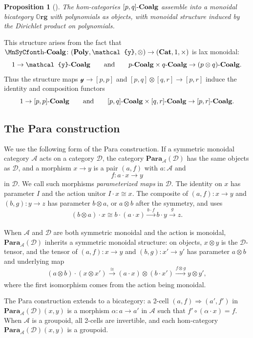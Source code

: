 \documentclass[11pt, oneside, article]{memoir}
\theoremstyle{definition}
\theoremstyle{plain}
\newtheorem{proposition}[proposition]{Proposition}
\DeclarePairedDelimiter{\ihom}{[}{]}
\newcommand{\cat}[1]{\mathcal{#1}}%
\newcommand{\Cat}[1]{\mathbf{#1}}%
\newcommand{\To}[2][]{\xrightarrow[#1]{#2}}
\newcommand{\tn}[1]{\textnormal{#1}}
\newcommand{\smcat}{\Cat{Cat}}
\newcommand{\yon}{\mathcal{y}}
\newcommand{\poly}{\Cat{Poly}}
\newcommand{\qqand}{\qquad\text{and}\qquad}
\newcommand{\coalg}{\tn{-}\Cat{Coalg}}
\newcommand{\org}{{\mathbb{O}\Cat{rg}}}
\newcommand{\Para}{\Cat{Para}}
\newcommand{\para}[2]{\Para_{#1}(#2)}
\newcommand{\smallsquare}{\mbox{\MnSyCfont\symbol{"68}}}
\newcommand{\blank}{\mathord{\smallsquare}}
\begin{document}
\begin{proposition}[\cite{spivak2021learners,shapiro2022dynamic}]\label{prop.org}
The hom-categories $\ihom{p,q}\coalg$ assemble into a monoidal bicategory $\org$ with polynomials as objects, with monoidal structure induced by the Dirichlet product on polynomials.
\end{proposition}

This structure arises from the fact that $\blank\coalg\colon(\poly,\yon,\otimes)\to(\smcat,1,\times)$ is lax monoidal:
\[
1\to\yon\coalg
\qqand
p\coalg\times q\coalg\to(p\otimes q)\coalg.
\]
Thus the structure maps $\yon\to[p,p]$ and $[p,q]\otimes[q,r]\to[p,r]$ induce the identity and composition functors
\[
1\to[p,p]\coalg
\qqand
[p,q]\coalg\times[q,r]\coalg\to[p,r]\coalg.
\]

\subsection{The Para construction}\label{sec.para_general}

We use the following form of the Para construction. If a symmetric monoidal category $\cat{A}$ acts on a category $\cat{D}$, the category $\para{\cat{A}}{\cat{D}}$ has the same objects as $\cat{D}$, and a morphism $x\to y$ is a pair $(a,f)$ with $a:\cat{A}$ and
\[
f\colon a\cdot x\to y
\]
in $\cat{D}$. We call such morphisms \emph{parameterized maps} in $\cat D$. The identity on $x$ has parameter $I$ and the action unitor $I\cdot x\cong x$. The composite of $(a,f)\colon x\to y$ and $(b,g)\colon y\to z$ has parameter $b\otimes a$, or $a\otimes b$ after the symmetry, and uses
\begin{equation}\label{eqn.para_map}
(b\otimes a)\cdot x\cong b\cdot(a\cdot x)\To{b\cdot f}b\cdot y\To{g}z.
\end{equation}

When $\cat A$ and $\cat D$ are both symmetric monoidal and the action is monoidal, $\para{\cat A}{\cat D}$ inherits a symmetric monoidal structure: on objects, $x\otimes y$ is the $\cat D$-tensor, and the tensor of $(a,f)\colon x\to y$ and $(b,g)\colon x'\to y'$ has parameter $a\otimes b$ and underlying map
\begin{equation}\label{eqn.para_tensor}
(a\otimes b)\cdot(x\otimes x')\To{\cong}(a\cdot x)\otimes(b\cdot x')\To{f\otimes g}y\otimes y',
\end{equation}
where the first isomorphism comes from the action being monoidal.

The Para construction extends to a bicategory: a 2-cell $(a,f)\Rightarrow(a',f')$ in $\para{\cat A}{\cat D}(x,y)$ is a morphism $\alpha\colon a\to a'$ in $\cat A$ such that $f'\circ(\alpha\cdot x)=f$. When $\cat A$ is a groupoid, all 2-cells are invertible, and each hom-category $\para{\cat A}{\cat D}(x,y)$ is a groupoid.
\end{document}
